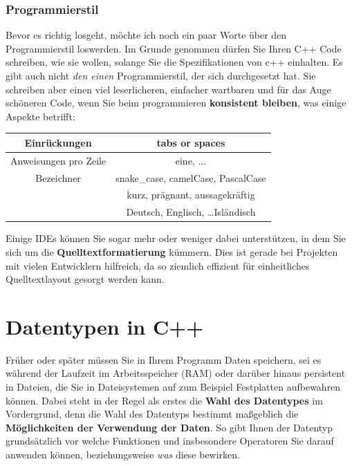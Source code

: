 \documentclass[a4paper]{report}
\begin{document}
\subsection{Programmierstil}
Bevor es richtig losgeht, möchte ich noch ein paar Worte über den Programmierstil loswerden. Im Grunde genommen dürfen Sie Ihren C++ Code schreiben, wie sie wollen, solange Sie die Spezifikationen von c++ einhalten. Es gibt auch nicht \textit{den einen} Programmierstil, der sich durchgesetzt hat. Sie schreiben aber einen viel leserlicheren, einfacher wartbaren und für das Auge schöneren Code, wenn Sie beim programmieren \textbf{konsistent bleiben}, was einige Aspekte betrifft:
\begin{center}
	\begin{tabular}{|c||c|}
		\hline
		Einrückungen	&	tabs or spaces \\ \hline
		Anweisungen pro Zeile & eine, ... \\ \hline
		Bezeichner		&	snake\_case, camelCase, PascalCase \\
		& kurz, prägnant, aussagekräftig \\ 
		& Deutsch, Englisch, \dots Isländisch \\ \hline
	\end{tabular}
\end{center}
Einige IDEs können Sie sogar mehr oder weniger dabei unterstützen, in dem Sie sich um die \textbf{Quelltextformatierung} kümmern. Dies ist gerade bei Projekten mit vielen Entwicklern hilfreich, da so ziemlich effizient für einheitliches Quelltextlayout gesorgt werden kann.

\chapter{Datentypen in C++} \label{real_start}

Früher oder später müssen Sie in Ihrem Programm Daten speichern, sei es während der Laufzeit im Arbeitsspeicher (RAM) oder darüber hinaus persistent in Dateien, die Sie in Dateisystemen auf zum Beispiel Festplatten aufbewahren können. Dabei steht in der Regel als erstes die \textbf{Wahl des Datentypes} im Vordergrund, denn die Wahl des Datentyps bestimmt maßgeblich die \textbf{Möglichkeiten der Verwendung der Daten}. So gibt Ihnen der Datentyp grundsätzlich vor welche Funktionen und insbesondere Operatoren Sie darauf anwenden können, beziehungsweise \textit{was} diese bewirken.
\end{document}
